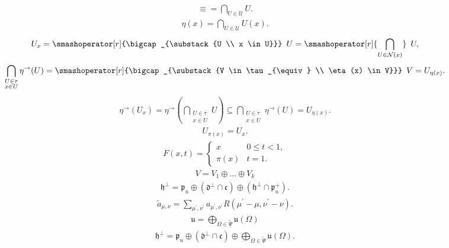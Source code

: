 \begin{align*}{\equiv} = \bigcap_{U \in \mathcal{U}}U.\end{align*}
\begin{align*}\eta(x) = \bigcap_{U \in \mathcal{U}} U(x).\end{align*}
\begin{align*}U_x = \smashoperator[r]{\bigcap_{\substack{U \\ x \in U}}} \enspace U = \smashoperator[r]{\bigcap_{U \in \mathcal N(x)}} \enspace U,\end{align*}
\begin{align*}\bigcap_{\substack{U \in \tau \\ x \in U}} \eta^\rightarrow(U) = \smashoperator[r]{\bigcap_{\substack{V \in \tau_{\equiv} \\ \eta(x) \in V}}} \enspace V = U_{\eta(x)}.\end{align*}
\begin{align*}\eta^\rightarrow(U_x) = \eta^\rightarrow\left(\bigcap_{\substack{U \in \tau \\ x \in U}} U\right) \subseteq \bigcap_{\substack{U \in \tau \\ x \in U}} \eta^\rightarrow(U) = U_{\eta(x)}.\end{align*}
\begin{align*} U_{\pi(x)} = U_x.\end{align*}
\begin{align*}F(x,t) =\begin{cases}x& 0 \leq t < 1, \\\pi(x) & t = 1.\end{cases}\end{align*}
\begin{align*} V = V_1 \oplus \ldots \oplus V_k\end{align*}
\begin{align*} \mathfrak h^\perp = \mathfrak p_u \oplus (\mathfrak d^\perp \cap \mathfrak c) \oplus (\mathfrak h^\perp \cap \mathfrak p^+_u).\end{align*}
\begin{align*}\widetilde{a}_{\mu, \nu}=\sum_{\mu^{\prime}, \nu^{\prime}}a_{\mu^{\prime}, \nu^{\prime}} R(\mu^{\prime}- \mu, \nu^{\prime}- \nu). \end{align*}
\begin{align*} \mathfrak u = \bigoplus\limits_{\Omega \in \widetilde \Psi} \mathfrak u(\Omega)\end{align*}
\begin{align*} \mathfrak h^\perp = \mathfrak p_u \oplus (\mathfrak d^\perp \cap \mathfrak c) \oplus \bigoplus\limits_{\Omega \in \widetilde \Psi} \mathfrak u(\Omega).\end{align*}
